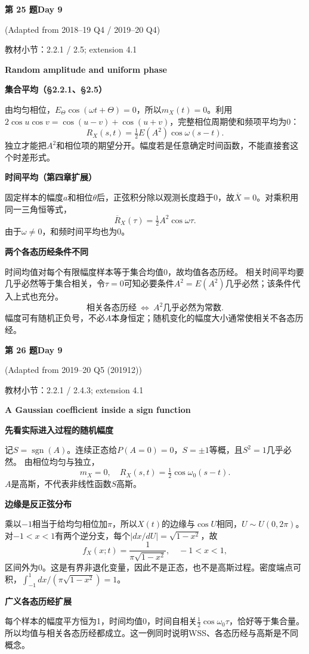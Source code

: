 \documentclass[10.5pt,fontset=fandol]{ctexart}
\newcommand{\key}[1]{\par\vspace{4pt}\noindent\textbf{\color{navy}#1}\par\vspace{2pt}}
\newcommand{\qtitle}[2]{\par\addvspace{1.2em}\Needspace{8\baselineskip}\begin{tcolorbox}[colback=navy,colframe=navy,arc=1.5pt,boxrule=0pt]\color{white}\large\bfseries #1\hfill\small #2\end{tcolorbox}}
\begin{document}
\qtitle{第 25 题}{Day 9}
{\small\color{accentred}(Adapted from 2018--19 Q4 / 2019--20 Q4)}\par\smallskip
{\small\color{muted}教材小节：2.2.1 / 2.5; extension 4.1}\par\medskip
\noindent\textbf{Random amplitude and uniform phase}\par\smallskip\begin{tcolorbox}[breakable,colback=qbg,colframe=qbg,boxrule=0pt]\key{集合平均（§2.2.1、§2.5）}
由均匀相位，$E_\Theta\cos(\omega t+\Theta)=0$，所以$m_X(t)=0$。利用$2\cos u\cos v=\cos(u-v)+\cos(u+v)$，完整相位周期使和频项平均为0：
\[\boxed{R_X(s,t)=\tfrac12E(A^2)\cos\omega(s-t)}.\]
独立才能把$A^2$和相位项的期望分开。幅度若是任意确定时间函数，不能直接套这个时差形式。
\key{时间平均（第四章扩展）}
固定样本的幅度$a$和相位$\theta$后，正弦积分除以观测长度趋于0，故$\overline X=0$。对乘积用同一三角恒等式，
\[\boxed{\overline R_X(\tau)=\tfrac12A^2\cos\omega\tau}.\]
由于$\omega\ne0$，和频时间平均也为0。
\key{两个各态历经条件不同}
时间均值对每个有限幅度样本等于集合均值0，故均值各态历经。
相关时间平均要几乎必然等于集合相关，令$\tau=0$可知必要条件$A^2=E(A^2)$几乎必然；该条件代入上式也充分。
\[\boxed{\text{相关各态历经}\ \Longleftrightarrow\ A^2\text{几乎必然为常数}}.\]
幅度可有随机正负号，不必$A$本身恒定；随机变化的幅度大小通常使相关不各态历经。
\end{tcolorbox}
\qtitle{第 26 题}{Day 9}
{\small\color{accentred}(Adapted from 2019--20 Q5 (201912))}\par\smallskip
{\small\color{muted}教材小节：2.2.1 / 2.4.3; extension 4.1}\par\medskip
\noindent\textbf{A Gaussian coefficient inside a sign function}\par\smallskip\begin{tcolorbox}[breakable,colback=qbg,colframe=qbg,boxrule=0pt]\key{先看实际进入过程的随机幅度}
记$S=\operatorname{sgn}(A)$。连续正态给$P(A=0)=0$，$S=\pm1$等概，且$S^2=1$几乎必然。
由相位均匀与独立，
\[\boxed{m_X=0,\quad R_X(s,t)=\tfrac12\cos\omega_0(s-t)}.\]
$A$是高斯，不代表非线性函数$S$高斯。
\key{边缘是反正弦分布}
乘以$-1$相当于给均匀相位加$\pi$，所以$X(t)$的边缘与$\cos U$相同，$U\sim U(0,2\pi)$。对$-1<x<1$有两个逆分支，每个$|dx/dU|=\sqrt{1-x^2}$，故
\[\boxed{f_X(x;t)=\frac1{\pi\sqrt{1-x^2}},\quad -1<x<1},\]
区间外为0。这是有界非退化变量，因此不是正态，也不是高斯过程。密度端点可积，$\int_{-1}^1dx/(\pi\sqrt{1-x^2})=1$。
\key{广义各态历经扩展}
每个样本的幅度平方恒为1，时间均值0，时间自相关$\tfrac12\cos\omega_0\tau$，恰好等于集合量。所以均值与相关各态历经都成立。这一例同时说明WSS、各态历经与高斯是不同概念。
\end{tcolorbox}
\end{document}

